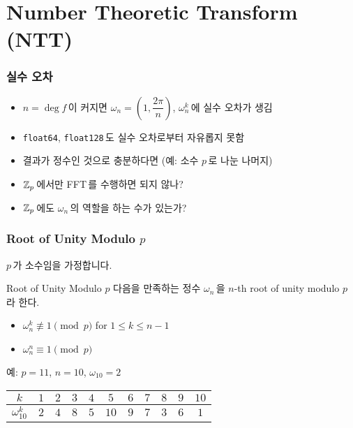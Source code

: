 \section{Number Theoretic Transform (NTT)}

\begin{frame}
    \frametitle{실수 오차}
    \begin{itemize}
        \item<1-> \(n = \deg f\)\,이 커지면 \(\omega_n = \left(1, \dfrac{2\pi}{n}\right)\), \(\omega_n^k\)\,에 실수 오차가 생김
        \item<2-> \texttt{float64}, \texttt{float128}\,도 실수 오차로부터 자유롭지 못함
    \end{itemize}

    \medskip

    \begin{itemize}
        \item<3-> 결과가 \alert{정수}인 것으로 충분하다면 (예: 소수 \(p\)\,로 나눈 나머지)
        \item<4-> \(\mathbb{Z}_p\)\,에서만 FFT\,를 수행하면 되지 않나?
    \end{itemize}

    \medskip

    \begin{itemize}
        \item<5-> \(\mathbb{Z}_p\)\,에도 \(\omega_n\)\,의 역할을 하는 수가 있는가?
    \end{itemize}
\end{frame}

\begin{frame}
    \frametitle{Root of Unity Modulo \(p\)}

    \(p\)\,가 소수임을 가정합니다.

    \begin{block}{Root of Unity Modulo \(p\)}
        다음을 만족하는 정수 \(\omega_n\)\,을 \alert{\(n\)-th root of unity modulo \(p\)}\,라 한다.
        \begin{itemize}
            \item \(\omega_n^k \not\equiv 1 \pmod{p}\) for \(1 \leq k \leq n - 1\)
            \item \(\omega_n^n \equiv 1 \pmod{p}\)
        \end{itemize}
    \end{block}

    \pause

    예: \(p = 11\), \(n = 10\), \(\omega_{10} = 2\)

    \begin{center}
        \begin{tabular}{|c|c|c|c|c|c|c|c|c|c|c|}
            \hline
            \(k\)             & \(1\) & \(2\) & \(3\) & \(4\) & \(5\)  & \(6\) & \(7\) & \(8\) & \(9\) & \alert{\(10\)} \\
            \hline
            \(\omega_{10}^k\) & \(2\) & \(4\) & \(8\) & \(5\) & \(10\) & \(9\) & \(7\) & \(3\) & \(6\) & \alert{\(1\)}  \\
            \hline
        \end{tabular}
    \end{center}
\end{frame}

